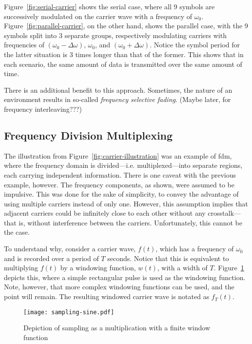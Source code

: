 \documentclass[class=report,11pt,crop=false]{standalone}
\begin{document}
Figure~\ref{fig:serial-carrier} shows the serial case, where all 9 symbols are successively modulated on the carrier wave with a frequency of \(\omega_0\). Figure~\ref{fig:parallel-carrier}, on the other hand, shows the parallel case, with the 9 symbols split into 3 separate groups, respectively modulating carriers with frequencies of \((\omega_0 - \Delta \omega)\), \(\omega_0\), and \((\omega_0 + \Delta \omega)\). Notice the symbol period for the latter situation is 3 times longer than that of the former. This shows that in each scenario, the same amount of data is transmitted over the same amount of time.

There is an additional benefit to this approach. Sometimes, the nature of an environment results in so-called \emph{frequency selective fading}. (Maybe later, for frequency interleaving???)

\subsection{Frequency Division Multiplexing}
The illustration from Figure~\ref{fig:carrier-illustration} was an example of \gls{fdm}, where the frequency domain is divided---i.e. multiplexed---into separate regions, each carrying independent information. There is one caveat with the previous example, however. The frequency components, as shown, were assumed to be impulsive. This was done for the sake of simplicity, to convey the advantage of using multiple carriers instead of only one. However, this assumption implies that adjacent carriers could be infinitely close to each other without any crosstalk---that is, without interference between the carriers. Unfortunately, this cannot be the case.

To understand why, consider a carrier wave, \(f(t)\), which has a frequency of \(\omega_0\) and is recorded over a period of \(T\) seconds. Notice that this is equivalent to multiplying \(f(t)\) by a windowing function, \(w(t)\), with a width of \(T\). Figure~\ref{fig:sampling-sine} depicts this, where a simple rectangular pulse is used as the windowing function. Note, however, that more complex windowing functions can be used, and the point will remain. The resulting windowed carrier wave is notated as \(f_T(t)\).

\begin{figure}[htbp]
    \centering
    \texttt{[image: sampling-sine.pdf]}
    \caption{Depiction of sampling as a multiplication with a finite window function}
    \label{fig:sampling-sine}
\end{figure}
\end{document}
